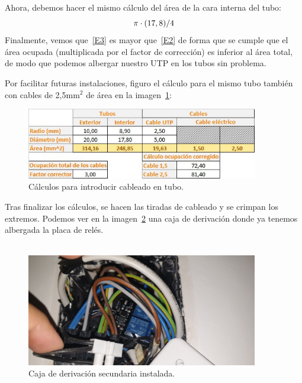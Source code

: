 Ahora, debemos hacer el mismo cálculo del área de la cara interna del tubo:
\begin{equation}
\centering
\pi \cdot (17,8)/4
\end{equation}\label{E3}
Finalmente, vemos que~\ref{E3} es mayor que~\ref{E2} de forma que se cumple que el área ocupada (multiplicada por el factor de corrección) es inferior al área total, de modo que podemos albergar nuestro UTP en los tubos sin problema.

Por facilitar futuras instalaciones, figuro el cálculo para el mismo tubo también con cables de 2,5mm$^{2}$ de área en la imagen~\ref{Img:Calculo}:

\begin{figure}[h]
    \centering
    \includegraphics[width=0.9\textwidth]{img/Diagramas/calculo cables.jpeg}
    \caption{Cálculos para introducir cableado en tubo.} \label{Img:Calculo}
\end{figure}

Tras finalizar los cálculos, se hacen las tiradas de cableado y se crimpan los extremos. Podemos ver en la imagen~\ref{Img:CajaDerivacion} una caja de derivación donde ya tenemos albergada la placa de relés.~\\~\\

\begin{figure}[h]
    \centering
    \includegraphics[width=0.9\textwidth]{img/fotos/caja-persiana.jpeg}
    \caption{Caja de derivación secundaria instalada.} \label{Img:CajaDerivacion}
\end{figure}

